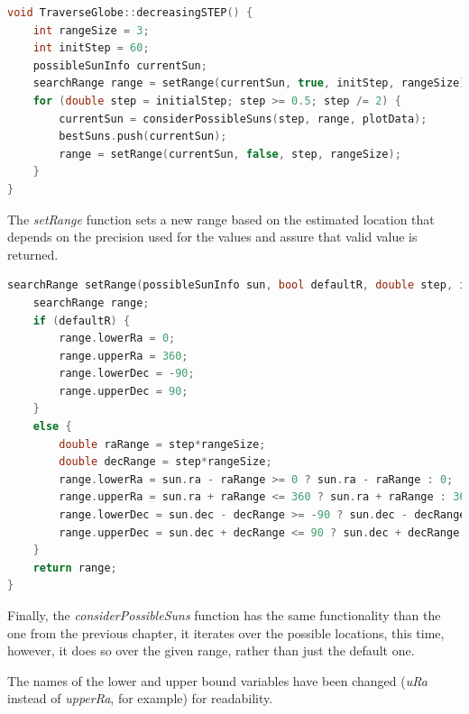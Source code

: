 \begin{minipage}{\linewidth}
	\begin{lstlisting}[language=c, caption=Decreasing the range and increasing the precision]
void TraverseGlobe::decreasingSTEP() {
	int rangeSize = 3;
	int initStep = 60;
	possibleSunInfo currentSun;
	searchRange range = setRange(currentSun, true, initStep, rangeSize);
	for (double step = initialStep; step >= 0.5; step /= 2) {
		currentSun = considerPossibleSuns(step, range, plotData);
		bestSuns.push(currentSun);
		range = setRange(currentSun, false, step, rangeSize);
	}
}\end{lstlisting}
\end{minipage}

The \textit{setRange} function sets a new range based on the estimated location that depends on the precision used for the values and assure that valid value is returned.

\begin{minipage}{\linewidth}
	\begin{lstlisting}[language=c, caption=Setting the new range based on the estimated source location]
searchRange setRange(possibleSunInfo sun, bool defaultR, double step, int rangeSize) {
	searchRange range;
	if (defaultR) {
		range.lowerRa = 0;
		range.upperRa = 360;
		range.lowerDec = -90;
		range.upperDec = 90;
	}
	else {
		double raRange = step*rangeSize;
		double decRange = step*rangeSize;
		range.lowerRa = sun.ra - raRange >= 0 ? sun.ra - raRange : 0;
		range.upperRa = sun.ra + raRange <= 360 ? sun.ra + raRange : 360;
		range.lowerDec = sun.dec - decRange >= -90 ? sun.dec - decRange : -90;
		range.upperDec = sun.dec + decRange <= 90 ? sun.dec + decRange : 90;
	}
	return range;
}\end{lstlisting}
\end{minipage}

Finally, the \textit{considerPossibleSuns} function has the same functionality than the one from the previous chapter, it iterates over the possible locations, this time, however, it does so over the given range, rather than just the default one.

The names of the lower and upper bound variables have been changed (\textit{uRa} instead of \textit{upperRa}, for example) for readability.

